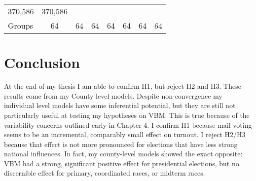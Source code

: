 \documentclass[12pt,twoside]{reedthesis}
\begin{document}
\begin{longtable}[]{@{}lccccccc@{}}
\begin{minipage}[t]{0.10\columnwidth}
  370,586\strut
  \end{minipage} & \begin{minipage}[t]{0.10\columnwidth}\centering\strut
  370,586\strut
  \end{minipage}\tabularnewline
  \begin{minipage}[t]{0.11\columnwidth}\raggedright\strut
  Groups\strut
  \end{minipage} & \begin{minipage}[t]{0.08\columnwidth}\centering\strut
  64\strut
  \end{minipage} & \begin{minipage}[t]{0.10\columnwidth}\centering\strut
  64\strut
  \end{minipage} & \begin{minipage}[t]{0.10\columnwidth}\centering\strut
  64\strut
  \end{minipage} & \begin{minipage}[t]{0.10\columnwidth}\centering\strut
  64\strut
  \end{minipage} & \begin{minipage}[t]{0.10\columnwidth}\centering\strut
  64\strut
  \end{minipage} & \begin{minipage}[t]{0.10\columnwidth}\centering\strut
  64\strut
  \end{minipage} & \begin{minipage}[t]{0.10\columnwidth}\centering\strut
  64\strut
  \end{minipage}\tabularnewline
  \bottomrule
  \end{longtable}
  
  \chapter*{Conclusion}\label{conclusion}
  
  \setcounter{chapter}{5} \setcounter{section}{0}
  
  At the end of my thesis I am able to confirm H1, but reject H2 and H3.
  These results come from my County level models. Despite non-convergence
  my individual level models have some inferential potential, but they are
  still not particularly useful at testing my hypotheses on VBM. This is
  true because of the variability concerns outlined early in Chapter 4. I
  confirm H1 because mail voting seems to be an incremental, comparably
  small effect on turnout. I reject H2/H3 because that effect is not more
  pronounced for elections that have less strong national influences. In
  fact, my county-level models showed the exact opposite: VBM had a
  strong, significant positive effect for presidential elections, but no
  discernible effect for primary, coordinated races, or midterm races.
  
\end{document}
